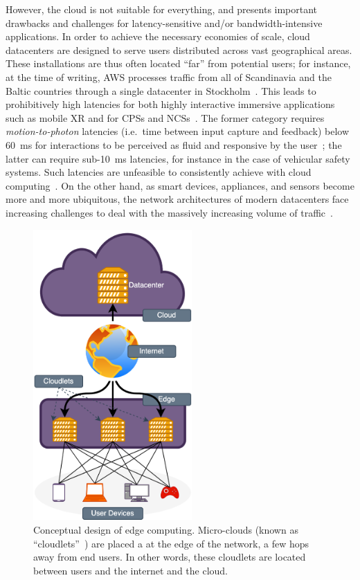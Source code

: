 However, the cloud is not suitable for everything, and presents important drawbacks and challenges for latency-sensitive and/or bandwidth-intensive applications.
In order to achieve the necessary economies of scale, cloud datacenters are designed to serve users distributed across vast geographical areas.
These installations are thus often located ``far'' from potential users;
for instance, at the time of writing, \gls{AWS} processes traffic from all of Scandinavia and the Baltic countries through a single datacenter in Stockholm~\cite{awsregions}.
This leads to prohibitively high latencies for both highly interactive immersive applications such as mobile \gls{XR} and for \glspl{CPS} and \glspl{NCS}~\cite{tolia2006quantifying,lagar2007interactive,satyanarayanan2009case,varghese2016challenges,shi2016promise}.
The former category requires \emph{motion-to-photon} latencies (i.e.\ time between input capture and feedback) below \SI{60}{\milli\second} for interactions to be perceived as fluid and responsive by the user~\cite{chen2017empirical}; the latter can require sub-\SI{10}{\milli\second} latencies, for instance in the case of vehicular safety systems.
Such latencies are unfeasible to consistently achieve with cloud computing~\cite{dang2021cloudy}.
On the other hand, as smart devices, appliances, and sensors become more and more ubiquitous, the network architectures of modern datacenters face increasing challenges to deal with the massively increasing volume of traffic~\cite{shi2016edge,wang2019towards}.

\begin{figure}
    \centering
    \includegraphics[height=30em]{figures/edgecomputing}
    \caption{%
        Conceptual design of edge computing.
        Micro-clouds (known as ``cloudlets''~\cite{satyanarayanan2009case}) are placed a at the edge of the network, a few hops away from end users.
        In other words, these cloudlets are located between users and the internet and the cloud.
    }\label{fig:edgecomputing}
\end{figure}

